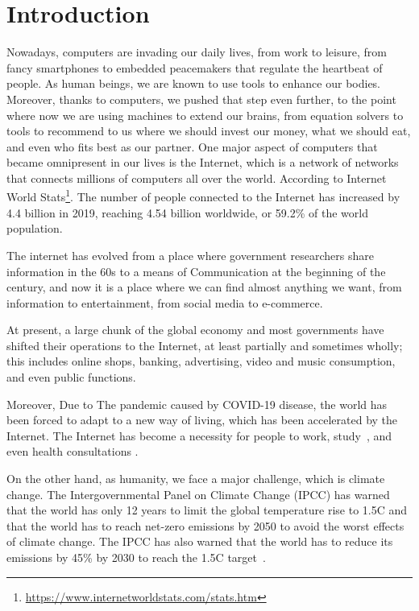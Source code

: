 \chapter{Introduction }
\label{chapter:introduction}

Nowadays, computers are invading our daily lives, from work to leisure, from fancy smartphones to embedded peacemakers that regulate the heartbeat of people.
As human beings, we are known to use tools to enhance our bodies. Moreover, thanks to computers, we pushed that step even further, to the point where now we are using machines to extend our brains, from equation solvers to tools to recommend to us where we should invest our money, what we should eat, and even who fits best as our partner.
One major aspect of computers that became omnipresent in our lives is the Internet, which is a network of networks that connects millions of computers all over the world. According to Internet World Stats\footnote{\url{https://www.internetworldstats.com/stats.htm}}. The number of people connected to the Internet has increased by 4.4 billion in 2019, reaching 4.54 billion worldwide, or 59.2\% of the world population.

The internet has evolved from a place where government researchers share information in the 60s to a means of Communication at the beginning of the century, and now it is a place where we can find almost anything we want, from information to entertainment, from social media to e-commerce.

At present, a large chunk of the global economy and most governments have shifted their operations to the Internet, at least partially and sometimes wholly; this includes online shops, banking, advertising, video and music consumption, and even public functions. 

Moreover, Due to The pandemic caused by COVID-19 disease, the world has been forced to adapt to a new way of living, which has been accelerated by the Internet. The Internet has become a necessity for people to work, study~\cite{naresh2020education}, and even health consultations \cite{liaw2021primary}.

On the other hand, as humanity, we face a major challenge, which is climate change. The Intergovernmental Panel on Climate Change (IPCC) has warned that the world has only 12 years to limit the global temperature rise to 1.5\degree C and that the world has to reach net-zero emissions by 2050 to avoid the worst effects of climate change. The IPCC has also warned that the world has to reduce its emissions by 45\% by 2030 to reach the 1.5\degree C target~\cite{portner2022climate}.


